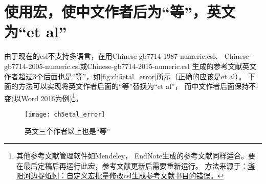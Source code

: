 \documentclass[cn,11pt,chinese]{elegantbook}
\begin{document}
		\section{使用宏，使中文作者后为“等”，英文为“et al”}\label{sec:etal}
			由于现在的csl不支持多语言，在用Chinese-gb7714-1987-numeric.csl、
			Chinese-gb7714-2005-numeric.csl或Chinese-gb7714-2015-numeric.csl
			生成的参考文献英文作者超过3个后面也是“等”，如\autoref{fig:ch5etal_error}所示（正确的应该是et al）。
			下面的方法可以实现将英文作者后面的“等”替换为“et al”，
			而中文作者后面保持不变(以Word 2016为例)\footnote{其他参考文献管理软件如Mendeley，
			EndNote生成的参考文献同样适合。要在最后定稿后再运行此宏，参考文献更新后需要重新运行。
			方法来源于：\href{https://zhuanlan.zhihu.com/p/53594081}
			{滏阳河边捉蚯蚓：自定义宏批量修改csl生成参考文献书目的错误。}}。
			\begin{figure}[htbp]
				\centering
				\texttt{[image: ch5etal\_error]}
				\caption{英文三个作者以上也是“等”}
				\label{fig:ch5etal_error}
			\end{figure}
		
\end{document}

